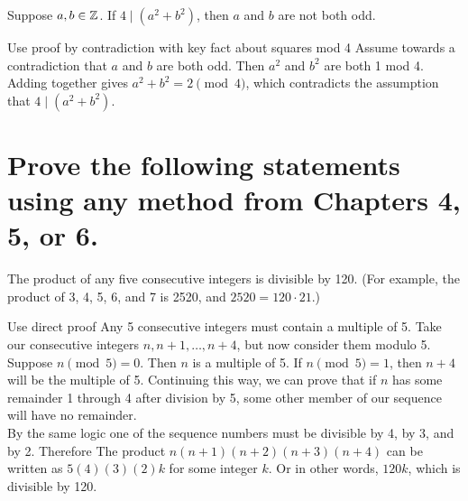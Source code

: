\documentclass{article}
\begin{document}
\begin{problem}
    Suppose $a, b \in \mathbb{Z}$. If $4 \mid (a^2 + b^2)$, then $a$ and $b$ are not both odd.
\end{problem}
\begin{solution}{Use proof by contradiction with key fact about squares mod 4}
    Assume towards a contradiction that $a$ and $b$ are both odd. Then $a^2$ and $b^2$ are both 1 mod 4. Adding together gives $a^2 + b^2 = 2 \pmod{4}$, which contradicts the assumption that $4 \mid (a^2 + b^2)$.
\end{solution}


\section{Prove the following statements using any method from Chapters 4, 5, or 6.}

\begin{problem}
    The product of any five consecutive integers is divisible by 120. (For example, the product of 3, 4, 5, 6, and 7 is 2520, and $2520 = 120 \cdot 21$.)
\end{problem}
\begin{solution}{Use direct proof}
    Any 5 consecutive integers must contain a multiple of 5. Take our consecutive integers $n, n+1, \ldots, n + 4$, but now consider them modulo 5. Suppose $n \pmod{5} = 0$. Then $n$ is a multiple of 5. If $n \pmod{5} = 1$, then $n + 4$ will be the multiple of 5. Continuing this way, we can prove that if $n$ has some remainder 1 through 4 after division by 5, some other member of our sequence will have no remainder.\\

    By the same logic one of the sequence numbers must be divisible by 4, by 3, and by 2. Therefore The product $n(n+1)(n+2)(n+3)(n+4)$ can be written as $5(4)(3)(2)k$ for some integer $k$. Or in other words, $120k$, which is divisible by 120.

\end{solution}
\end{document}
